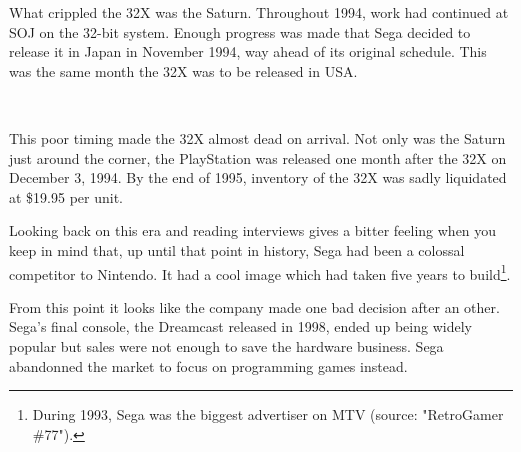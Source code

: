 What crippled the 32X was the Saturn. Throughout 1994, work had continued at SOJ on the 32-bit system. Enough progress was made that Sega decided to release it in Japan in November 1994, way ahead of its original schedule. This was the same month the 32X was to be released in USA.\\

\par

\\
 \par This poor timing made the 32X almost dead on arrival. Not only was the Saturn just around the corner, the  PlayStation was released one month after the 32X on December 3, 1994. By the end of 1995, inventory of the 32X was sadly liquidated at \$19.95 per unit.\\
\par
Looking back on this era and reading interviews gives a bitter feeling when you keep in mind that, up until that point in history, Sega had been a colossal competitor to Nintendo. It had a cool image which had taken five years to build\footnote{During 1993, Sega was the biggest advertiser on MTV (source: "RetroGamer \#77").}.\\
\par
 From this point it looks like the company made one bad decision after an other. Sega's final console, the Dreamcast released in 1998, ended up being widely popular but sales were not enough to save the hardware business. Sega abandonned the market to focus on programming games instead.





